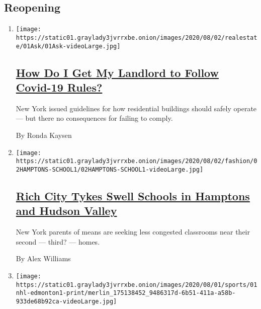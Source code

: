 \hypertarget{reopening}{%
\subsection{Reopening}\label{reopening}}

\begin{enumerate}
\def\labelenumi{\arabic{enumi}.}
\item
  \texttt{[image: https://static01.graylady3jvrrxbe.onion/images/2020/08/02/realestate/01Ask/01Ask-videoLarge.jpg]}

  \hypertarget{how-do-i-get-my-landlord-to-follow-covid-19-rules}{%
  \subsection{\texorpdfstring{\href{/2020/08/01/realestate/coronavirus-covid-apartment-buildings.html}{How
  Do I Get My Landlord to Follow Covid-19
  Rules?}}{How Do I Get My Landlord to Follow Covid-19 Rules?}}\label{how-do-i-get-my-landlord-to-follow-covid-19-rules}}

  New York issued guidelines for how residential buildings should safely
  operate --- but there no consequences for failing to comply.

  By Ronda Kaysen
\item
  \texttt{[image: https://static01.graylady3jvrrxbe.onion/images/2020/08/02/fashion/02HAMPTONS-SCHOOL1/02HAMPTONS-SCHOOL1-videoLarge.jpg]}

  \hypertarget{rich-city-tykes-swell-schools-in-hamptons-and-hudson-valley}{%
  \subsection{\texorpdfstring{\href{/2020/08/01/style/wealthy-rich-parents-coronavirus-schools-hamptons.html}{Rich
  City Tykes Swell Schools in Hamptons and Hudson
  Valley}}{Rich City Tykes Swell Schools in Hamptons and Hudson Valley}}\label{rich-city-tykes-swell-schools-in-hamptons-and-hudson-valley}}

  New York parents of means are seeking less congested classrooms near
  their second --- third? --- homes.

  By Alex Williams
\item
  \texttt{[image: https://static01.graylady3jvrrxbe.onion/images/2020/08/01/sports/01nhl-edmonton1-print/merlin\_175138452\_9486317d-6b51-411a-a58b-933de68b92ca-videoLarge.jpg]}

  \hypertarget{edmonton-city-of-champions-readies-for-a-hockey-marathon}{%
}
\end{enumerate}
